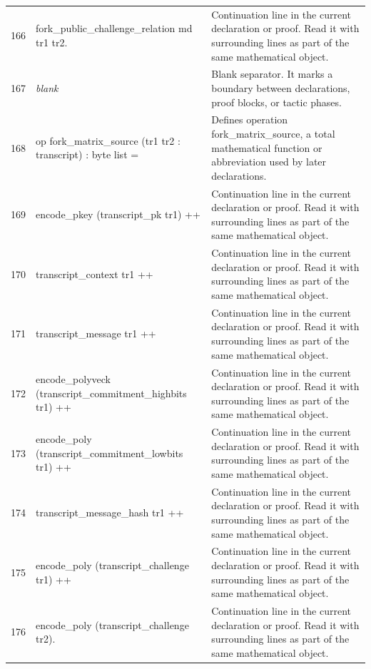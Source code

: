 \documentclass[10pt]{article}
\begin{document}
\begin{longtable}{r L{0.53\textwidth} L{0.37\textwidth}}
166 & {\ttfamily\scriptsize   fork\_public\_challenge\_relation md tr1 tr2.} & Continuation line in the current declaration or proof.  Read it with surrounding lines as part of the same mathematical object. \\
167 & {\ttfamily\scriptsize \emph{blank}} & Blank separator.  It marks a boundary between declarations, proof blocks, or tactic phases. \\
168 & {\ttfamily\scriptsize op fork\_matrix\_source (tr1 tr2 : transcript) : byte list =} & Defines operation fork\_matrix\_source, a total mathematical function or abbreviation used by later declarations. \\
169 & {\ttfamily\scriptsize   encode\_pkey (transcript\_pk tr1) ++} & Continuation line in the current declaration or proof.  Read it with surrounding lines as part of the same mathematical object. \\
170 & {\ttfamily\scriptsize   transcript\_context tr1 ++} & Continuation line in the current declaration or proof.  Read it with surrounding lines as part of the same mathematical object. \\
171 & {\ttfamily\scriptsize   transcript\_message tr1 ++} & Continuation line in the current declaration or proof.  Read it with surrounding lines as part of the same mathematical object. \\
172 & {\ttfamily\scriptsize   encode\_polyveck (transcript\_commitment\_highbits tr1) ++} & Continuation line in the current declaration or proof.  Read it with surrounding lines as part of the same mathematical object. \\
173 & {\ttfamily\scriptsize   encode\_poly (transcript\_commitment\_lowbits tr1) ++} & Continuation line in the current declaration or proof.  Read it with surrounding lines as part of the same mathematical object. \\
174 & {\ttfamily\scriptsize   transcript\_message\_hash tr1 ++} & Continuation line in the current declaration or proof.  Read it with surrounding lines as part of the same mathematical object. \\
175 & {\ttfamily\scriptsize   encode\_poly (transcript\_challenge tr1) ++} & Continuation line in the current declaration or proof.  Read it with surrounding lines as part of the same mathematical object. \\
176 & {\ttfamily\scriptsize   encode\_poly (transcript\_challenge tr2).} & Continuation line in the current declaration or proof.  Read it with surrounding lines as part of the same mathematical object. \\

\end{longtable}
\end{document}
